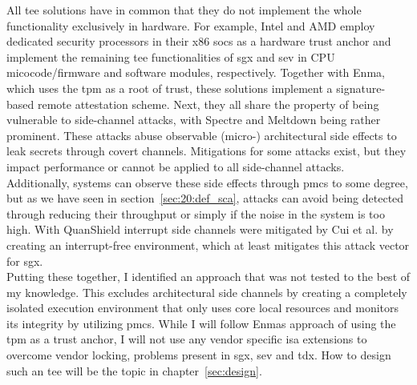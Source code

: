 All \gls{tee} solutions have in common that they do not implement the whole
functionality exclusively in hardware. For example, Intel and AMD employ
dedicated security processors in their x86 \glspl{soc} as a hardware trust
anchor and implement the remaining \gls{tee} functionalities of \gls{sgx} and
\gls{sev} in CPU micocode/firmware and software modules, respectively. Together
with Enma, which uses the \gls{tpm} as a root of trust, these solutions
implement a signature-based remote attestation scheme. Next, they all share the
property of being vulnerable to side-channel attacks, with Spectre and Meltdown
being rather prominent. These attacks abuse observable (micro-) architectural
side effects to leak secrets through covert channels. Mitigations for some
attacks exist, but they impact performance or cannot be applied to all
side-channel attacks. Additionally, systems can observe these side effects
through \glspl{pmc} to some degree, but as we have seen in
section~\ref{sec:20:def_sca}, attacks can avoid being detected through reducing
their throughput or simply if the noise in the system is too high. With
QuanShield interrupt side channels were mitigated by Cui et al. by creating an
interrupt-free environment, which at least mitigates this attack vector for
\gls{sgx}.\\

Putting these together, I identified an approach that was not tested to the best
of my knowledge. This excludes architectural side channels by creating a
completely isolated execution environment that only uses core local resources
and monitors its integrity by utilizing \glspl{pmc}. While I will follow Enmas
approach of using the \gls{tpm} as a trust anchor, I will not use any vendor
specific \gls{isa} extensions to overcome vendor locking, problems present in
\gls{sgx}, \gls{sev} and \gls{tdx}. How to design such an \gls{tee} will be the
topic in chapter~\ref{sec:design}.

